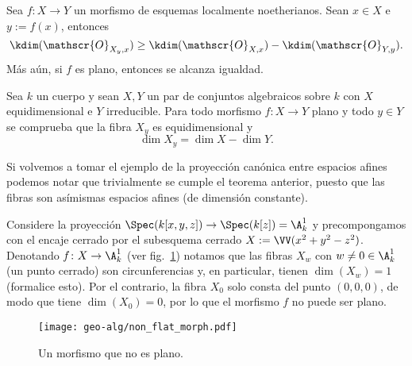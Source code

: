 \begin{thm}\label{thm:flat_dim_formula}
	Sea $f\colon X \to Y$ un morfismo de esquemas localmente noetherianos.
	Sean $x \in X$ e $y := f(x)$, entonces
	$$ \kdim(\mathscr{O}_{X_y, x}) \ge \kdim( \mathscr{O}_{X, x} ) - \kdim(\mathscr{O}_{Y, y}). $$
	Más aún, si $f$ es plano, entonces se alcanza igualdad.
\end{thm}

\begin{cor}\label{thm:flat_fibers_dimension}
	Sea $k$ un cuerpo y sean $X, Y$ un par de conjuntos algebraicos sobre $k$ con $X$ equidimensional e $Y$ irreducible.
	Para todo morfismo $f\colon X \to Y$ plano y todo $y \in Y$ se comprueba que la fibra $X_y$ es equidimensional y
	$$ \dim X_y = \dim X - \dim Y. $$
\end{cor}

Si volvemos a tomar el ejemplo de la proyección canónica entre espacios afines podemos notar que trivialmente se cumple el teorema anterior,
puesto que las fibras son asímismas espacios afines (de dimensión constante).
\begin{ex}
	Considere la proyección $\Spec(k[x, y, z]) \to \Spec(k[z]) = \A^1_k$ y precompongamos con el encaje cerrado por el subesquema cerrado
	$X := \VV(x^2 + y^2 - z^2)$.
	Denotando $f \colon X \to \A^1_k$ (ver fig.~\ref{fig:geo-alg/non_flat_morph}) notamos que las fibras $X_w$ con $w \ne 0 \in \A^1_k$ (un punto cerrado)
	son circunferencias y, en particular, tienen $\dim(X_w) = 1$ (formalice esto).
	Por el contrario, la fibra $X_0$ solo consta del punto $(0, 0, 0)$, de modo que tiene $\dim(X_0) = 0$, por lo que el morfismo $f$ no puede ser plano.
\end{ex}
\begin{figure}[!hbt]
	\centering
	\texttt{[image: geo-alg/non\_flat\_morph.pdf]}
	\caption{Un morfismo que no es plano.}%
	\label{fig:geo-alg/non_flat_morph}
\end{figure}

